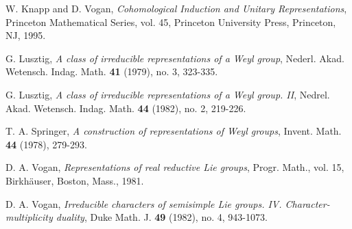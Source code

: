 \documentclass[12pt, a4paper]{amsart}
\numberwithin{equation}{section}
\begin{document}
\begin{thebibliography}{99}
    W. Knapp and D. Vogan, \textit{Cohomological Induction and Unitary Representations}, Princeton Mathematical Series, vol. 45, Princeton University Press, Princeton, NJ, 1995.

    G. Lusztig, \textit{A class of irreducible representations of a Weyl group}, Nederl. Akad. Wetensch. Indag. Math. \textbf{41} (1979), no. 3, 323-335.

    G. Lusztig, \textit{A class of irreducible representations of a Weyl group. II}, Nedrel. Akad. Wetensch. Indag. Math. \textbf{44} (1982), no. 2, 219-226.

    T. A. Springer, \textit{A construction of representations of Weyl groups}, Invent. Math. \textbf{44} (1978), 279-293.



   D. A. Vogan, \textit{Representations of real reductive Lie groups}, Progr. Math., vol. 15, Birkh\"{a}user, Boston, Mass., 1981.

   D. A. Vogan, \textit{Irreducible characters of semisimple Lie groups. IV. Character-multiplicity duality}, Duke Math. J. \textbf{49} (1982), no. 4, 943-1073.











\end{thebibliography}
\end{document}
